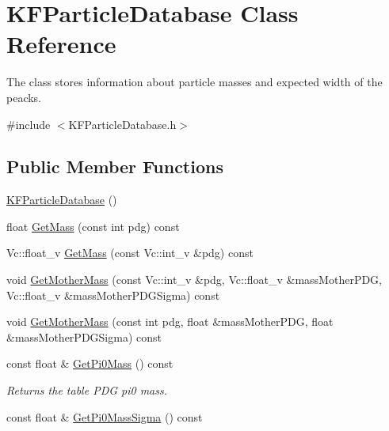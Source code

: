 \hypertarget{classKFParticleDatabase}{}\section{K\+F\+Particle\+Database Class Reference}
\label{classKFParticleDatabase}


The class stores information about particle masses and expected width of the peacks.  




{\ttfamily \#include $<$K\+F\+Particle\+Database.\+h$>$}

\subsection*{Public Member Functions}
\begin{DoxyCompactItemize}
\item 
\hyperlink{classKFParticleDatabase_a8c1b936fcb4465f754423ebf556c6d65}{K\+F\+Particle\+Database} ()
\item 
float \hyperlink{classKFParticleDatabase_ad076360075bd9ca1005ffed61c21b965}{Get\+Mass} (const int pdg) const 
\item 
Vc\+::float\+\_\+v \hyperlink{classKFParticleDatabase_ac5e206b7ca000c6df19430e0b8b809f3}{Get\+Mass} (const Vc\+::int\+\_\+v \&pdg) const 
\item 
void \hyperlink{classKFParticleDatabase_a9e1214555186addad65e0ab8d375b848}{Get\+Mother\+Mass} (const Vc\+::int\+\_\+v \&pdg, Vc\+::float\+\_\+v \&mass\+Mother\+P\+DG, Vc\+::float\+\_\+v \&mass\+Mother\+P\+D\+G\+Sigma) const 
\item 
void \hyperlink{classKFParticleDatabase_a616e1c88309bdbf22a8f2aa741c0e46f}{Get\+Mother\+Mass} (const int pdg, float \&mass\+Mother\+P\+DG, float \&mass\+Mother\+P\+D\+G\+Sigma) const 
\item 
const float \& \hyperlink{classKFParticleDatabase_a37ea7921fc514b258434a0daee63db6b}{Get\+Pi0\+Mass} () const \hypertarget{classKFParticleDatabase_a37ea7921fc514b258434a0daee63db6b}{}\label{classKFParticleDatabase_a37ea7921fc514b258434a0daee63db6b}

\begin{DoxyCompactList}\small\item\em Returns the table P\+DG pi0 mass. \end{DoxyCompactList}\item 
const float \& \hyperlink{classKFParticleDatabase_aa30d84266753cc8c6d72c03f02633de3}{Get\+Pi0\+Mass\+Sigma} () const \hypertarget{classKFParticleDatabase_aa30d84266753cc8c6d72c03f02633de3}{}\label{classKFParticleDatabase_aa30d84266753cc8c6d72c03f02633de3}


\end{DoxyCompactItemize}

